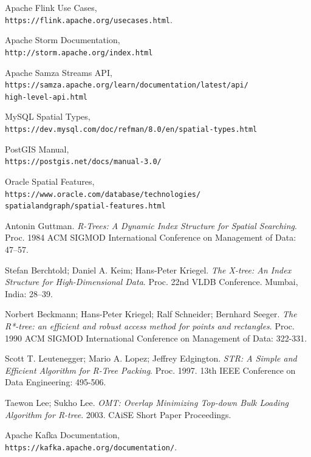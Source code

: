 \documentclass[14pt]{article}
\begin{document}
\begin{thebibliography}{9}
Apache Flink Use Cases,\\
\texttt{https://flink.apache.org/usecases.html}.

Apache Storm Documentation,\\
\texttt{http://storm.apache.org/index.html}

Apache Samza Streams API,\\
\texttt{https://samza.apache.org/learn/documentation/latest/api/\\high-level-api.html}

MySQL Spatial Types,\\
\texttt{https://dev.mysql.com/doc/refman/8.0/en/spatial-types.html}

PostGIS Manual,\\
\texttt{https://postgis.net/docs/manual-3.0/}

Oracle Spatial Features,\\
\texttt{https://www.oracle.com/database/technologies/\\spatialandgraph/spatial-features.html}

Antonin Guttman. \textit{R-Trees: A Dynamic Index Structure for Spatial Searching}. Proc. 1984 ACM SIGMOD International Conference on Management of Data: 47–57.

Stefan Berchtold; Daniel A. Keim; Hans-Peter Kriegel. \textit{The X-tree: An Index Structure for High-Dimensional Data}. Proc. 22nd VLDB Conference. Mumbai, India: 28–39.

Norbert Beckmann; Hans-Peter Kriegel; Ralf Schneider; Bernhard Seeger. \textit{The R*-tree: an efficient and robust access method for points and rectangles}. Proc. 1990 ACM SIGMOD International Conference on Management of Data: 322-331.

Scott T. Leutenegger; Mario A. Lopez; Jeffrey Edgington. \textit{STR: A Simple and Efficient Algorithm for R-Tree Packing}. Proc. 1997. 13th IEEE Conference on Data Engineering: 495-506.

Taewon Lee; Sukho Lee. \textit{OMT: Overlap Minimizing Top-down Bulk Loading Algorithm for R-tree}. 2003. CAiSE Short Paper Proceedings.

Apache Kafka Documentation,\\
\texttt{https://kafka.apache.org/documentation/}.


\end{thebibliography}
\end{document}
